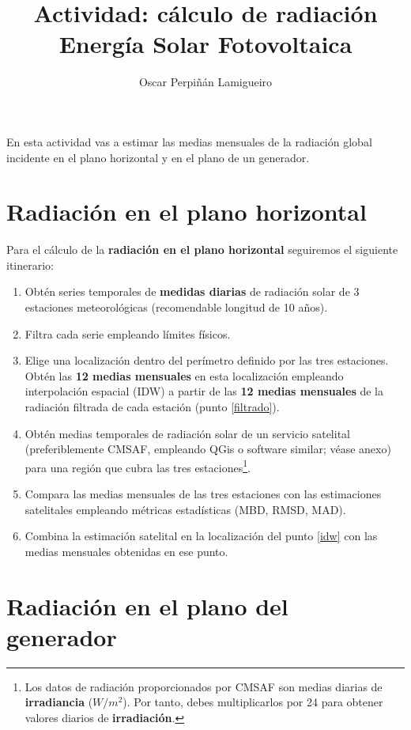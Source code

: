 \documentclass[11pt]{article}
\author{Oscar Perpiñán Lamigueiro}
\date{}
\title{Actividad: cálculo de radiación\\\medskip
\large Energía Solar Fotovoltaica}
\begin{document}
\maketitle

En esta actividad vas a estimar las medias mensuales de la radiación global incidente en el plano horizontal y en el plano de un generador.

\section{Radiación en el plano horizontal}

Para el cálculo de la \textbf{radiación en el plano horizontal} seguiremos el siguiente itinerario:

\begin{enumerate}
\item Obtén series temporales de \textbf{medidas diarias} de radiación solar de 3 estaciones meteorológicas (recomendable longitud de 10 años).
\item Filtra cada serie empleando límites físicos. \label{filtrado}
\item Elige una localización dentro del perímetro definido por las tres estaciones. Obtén las \textbf{12 medias mensuales} en esta localización empleando interpolación espacial (IDW) a partir de las \textbf{12 medias mensuales} de la radiación filtrada de cada estación (punto \ref{filtrado}). \label{idw}
\item Obtén medias temporales de radiación solar de un servicio satelital (preferiblemente CMSAF,  empleando QGis o software similar; véase anexo) para una región que cubra las tres estaciones\footnote{Los datos de radiación proporcionados por CMSAF son medias diarias de \textbf{irradiancia} (\(W/m^2\)). Por tanto, debes multiplicarlos por 24 para obtener valores diarios de \textbf{irradiación}.}.\label{satelite}
\item Compara las medias mensuales de las tres estaciones con las estimaciones satelitales empleando métricas estadísticas (MBD, RMSD, MAD).
\item Combina la estimación satelital en la localización del punto \ref{idw} con las medias mensuales obtenidas en ese punto.
\end{enumerate}

\clearpage

\section{Radiación en el plano del generador}
\end{document}

